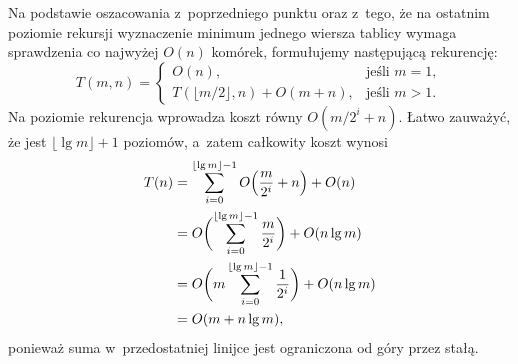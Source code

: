 \subproblem %
Na podstawie oszacowania z~poprzedniego punktu oraz z~tego, że na ostatnim poziomie rekursji wyznaczenie minimum jednego wiersza tablicy wymaga sprawdzenia co najwyżej $O(n)$ komórek, formułujemy następującą rekurencję:
\[
	T(m,n) =
	\begin{cases}
		O(n), & \text{jeśli $m=1$}, \\
		T(\lfloor m/2\rfloor,n)+O(m+n), & \text{jeśli $m>1$}.
	\end{cases}
\]
Na  poziomie rekurencja wprowadza koszt równy $O(m/2^i+n)$. Łatwo zauważyć, że jest $\lfloor\lg m\rfloor+1$ poziomów, a~zatem całkowity koszt wynosi
\begin{align*}
	T(n) &= \sum_{i=0}^{\lfloor\lg m\rfloor-1}O\Bigl(\frac{m}{2^i}+n\Bigr)+O(n) \\
	&= O\biggl(\sum_{i=0}^{\lfloor\lg m\rfloor-1}\frac{m}{2^i}\biggr)+O(n\lg m) \\
	&= O\biggl(m\sum_{i=0}^{\lfloor\lg m\rfloor-1}\frac{1}{2^i}\biggr)+O(n\lg m) \\
	&= O(m+n\lg m),
\end{align*}
ponieważ suma w~przedostatniej linijce jest ograniczona od góry przez stałą.

\endinput
